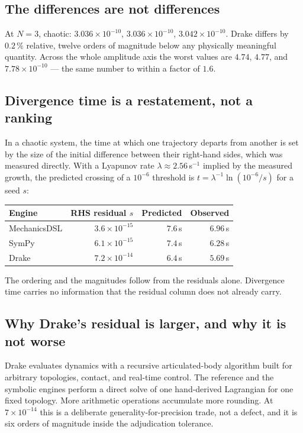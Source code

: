 \documentclass[11pt,a4paper]{article}
\begin{document}
\subsection{The differences are not differences}

At $N=3$, chaotic: $3.036\times10^{-10}$, $3.036\times10^{-10}$,
$3.042\times10^{-10}$. Drake differs by $0.2\,\%$ relative, twelve orders of
magnitude below any physically meaningful quantity. Across the whole amplitude
axis the worst values are $4.74$, $4.77$, and $7.78\times10^{-10}$ --- the same
number to within a factor of $1.6$.

\subsection{Divergence time is a restatement, not a ranking}

In a chaotic system, the time at which one trajectory departs from another is
set by the size of the initial difference between their right-hand sides, which
was measured directly. With a Lyapunov rate $\lambda \approx 2.56\,$s$^{-1}$
implied by the measured growth, the predicted crossing of a $10^{-6}$ threshold
is $t = \lambda^{-1}\ln(10^{-6}/s)$ for a seed $s$:

\begin{center}
\begin{tabular}{@{}lrrr@{}}
\toprule
\textbf{Engine} & \textbf{RHS residual $s$} & \textbf{Predicted} & \textbf{Observed} \\
\midrule
MechanicsDSL & $3.6\times10^{-15}$ & $7.6$\,s & $6.96$\,s \\
SymPy        & $6.1\times10^{-15}$ & $7.4$\,s & $6.28$\,s \\
Drake        & $7.2\times10^{-14}$ & $6.4$\,s & $5.69$\,s \\
\bottomrule
\end{tabular}
\end{center}

\noindent The ordering and the magnitudes follow from the residuals alone.
Divergence time carries no information that the residual column does not
already carry.

\subsection{Why Drake's residual is larger, and why it is not worse}

Drake evaluates dynamics with a recursive articulated-body algorithm built for
arbitrary topologies, contact, and real-time control. The reference and the
symbolic engines perform a direct solve of one hand-derived Lagrangian for one
fixed topology. More arithmetic operations accumulate more rounding. At
$7\times10^{-14}$ this is a deliberate generality-for-precision trade, not a
defect, and it is six orders of magnitude inside the adjudication tolerance.
\end{document}

